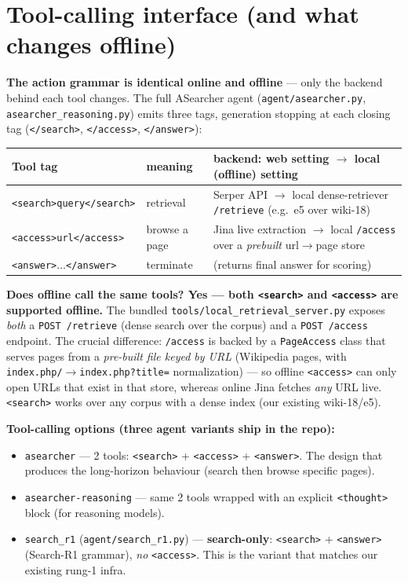 \documentclass[10pt]{article}
\newcommand{\cmd}[1]{\texttt{\small #1}}
\begin{document}
\section{Tool-calling interface (and what changes offline)}
\textbf{The action grammar is identical online and offline} --- only the backend behind each tool changes.
The full ASearcher agent (\cmd{agent/asearcher.py}, \cmd{asearcher\_reasoning.py}) emits three tags,
generation stopping at each closing tag (\cmd{</search>}, \cmd{</access>}, \cmd{</answer>}):
\begin{center}\small
\begin{tabular}{lll}
\toprule
Tool tag & meaning & backend: web setting $\to$ local (offline) setting \\
\midrule
\cmd{<search>query</search>} & retrieval & Serper API $\to$ local dense-retriever \cmd{/retrieve} (e.g.\ e5 over wiki-18) \\
\cmd{<access>url</access>} & browse a page & Jina live extraction $\to$ local \cmd{/access} over a \emph{prebuilt} url$\to$page store \\
\cmd{<answer>$\ldots$</answer>} & terminate & (returns final answer for scoring) \\
\bottomrule
\end{tabular}
\end{center}

\noindent\textbf{Does offline call the same tools? Yes --- both \cmd{<search>} and \cmd{<access>} are
supported offline.} The bundled \cmd{tools/local\_retrieval\_server.py} exposes \emph{both} a
\cmd{POST /retrieve} (dense search over the corpus) and a \cmd{POST /access} endpoint. The crucial
difference: \cmd{/access} is backed by a \cmd{PageAccess} class that serves pages from a \emph{pre-built
file keyed by URL} (Wikipedia pages, with \cmd{index.php/}$\to$\cmd{index.php?title=} normalization) --- so
offline \cmd{<access>} can only open URLs that exist in that store, whereas online Jina fetches
\emph{any} URL live. \cmd{<search>} works over any corpus with a dense index (our existing wiki-18/e5).

\smallskip
\noindent\textbf{Tool-calling options (three agent variants ship in the repo):}
\begin{itemize}
\item \cmd{asearcher} --- 2 tools: \cmd{<search>} + \cmd{<access>} + \cmd{<answer>}. The design that
produces the long-horizon behaviour (search then browse specific pages).
\item \cmd{asearcher-reasoning} --- same 2 tools wrapped with an explicit \cmd{<thought>} block (for
reasoning models).
\item \cmd{search\_r1} (\cmd{agent/search\_r1.py}) --- \textbf{search-only}: \cmd{<search>} + \cmd{<answer>}
(Search-R1 grammar), \emph{no} \cmd{<access>}. This is the variant that matches our existing rung-1 infra.
\end{itemize}
\end{document}
